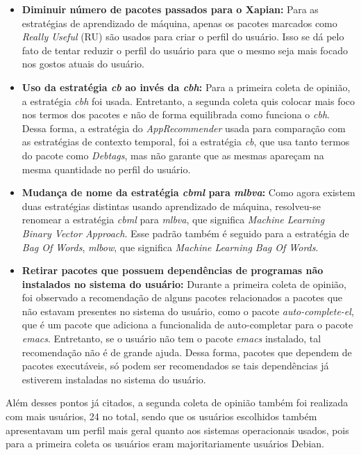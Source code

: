 \begin{itemize}
   \item \textbf{Diminuir número de pacotes passados para o Xapian:} Para as
   estratégias de aprendizado de máquina, apenas os pacotes marcados como
   \textit{Really Useful} (RU) são usados para criar o perfil do
   usuário. Isso se dá pelo fato de tentar reduzir o perfil do usuário para
   que o mesmo seja mais focado nos gostos atuais do usuário.

   \item \textbf{Uso da estratégia \textit{cb} ao invés da \textit{cbh}:} Para
   a primeira coleta de opinião, a estratégia \textit{cbh} foi usada. Entretanto,
   a segunda coleta quis colocar mais foco nos termos dos pacotes e
   não de forma equilibrada como funciona o \textit{cbh}. Dessa forma,
   a estratégia do \textit{AppRecommender} usada para comparação com as
   estratégias de contexto temporal, foi a estratégia \textit{cb}, que usa
   tanto termos do pacote como \textit{Debtags}, mas não garante que as mesmas
   apareçam na mesma quantidade no perfil do usuário.

   \item \textbf{Mudança de nome da estratégia \textit{cbml} para
   \textit{mlbva}:} Como agora existem duas estratégias distintas usando
   aprendizado de máquina, resolveu-se renomear a estratégia \textit{cbml}
   para \textit{mlbva}, que significa \textit{Machine Learning Binary
   Vector Approach}. Esse padrão também é seguido para a estratégia de
   \textit{Bag Of Words}, \textit{mlbow}, que significa \textit{Machine
   Learning Bag Of Words}.

   \item \textbf{Retirar pacotes que possuem dependências de programas não
   instalados no sistema do usuário:} Durante a primeira coleta de opinião, foi
   observado a recomendação de alguns pacotes relacionados a pacotes que não
   estavam presentes no sistema do usuário, como o pacote
   \textit{auto-complete-el}, que é um pacote que adiciona a funcionalida
   de auto-completar para o pacote \textit{emacs}. Entretanto, se o usuário
   não tem o pacote \textit{emacs} instalado, tal recomendação não é de
   grande ajuda. Dessa forma, pacotes que dependem de pacotes executáveis,
   só podem ser recomendados se tais dependências já estiverem instaladas
   no sistema do usuário.

\end{itemize}

Além desses pontos já citados, a segunda coleta de opinião também foi realizada com
mais usuários, 24 no total, sendo que os usuários escolhidos também apresentavam
um perfil mais geral quanto aos sistemas operacionais usados, pois para a
primeira coleta os usuários eram majoritariamente usuários Debian.

